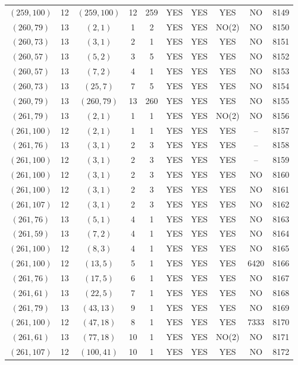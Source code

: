 \begin{longtable}{|c|c|c|c|c|c|c|c|c|c|}
$(259, 100)$ & 12 & $(259, 100)$ & 12 & 259 & YES & YES & YES & NO & 8149\\
$(260, 79)$ & 13 & $(2, 1)$ & 1 & 2 & YES & YES & NO(2) & NO & 8150\\
$(260, 73)$ & 13 & $(3, 1)$ & 2 & 1 & YES & YES & YES & NO & 8151\\
$(260, 57)$ & 13 & $(5, 2)$ & 3 & 5 & YES & YES & YES & NO & 8152\\
$(260, 57)$ & 13 & $(7, 2)$ & 4 & 1 & YES & YES & YES & NO & 8153\\
$(260, 73)$ & 13 & $(25, 7)$ & 7 & 5 & YES & YES & YES & NO & 8154\\
$(260, 79)$ & 13 & $(260, 79)$ & 13 & 260 & YES & YES & YES & NO & 8155\\
$(261, 79)$ & 13 & $(2, 1)$ & 1 & 1 & YES & YES & NO(2) & NO & 8156\\
$(261, 100)$ & 12 & $(2, 1)$ & 1 & 1 & YES & YES & YES & -- & 8157\\
$(261, 76)$ & 13 & $(3, 1)$ & 2 & 3 & YES & YES & YES & -- & 8158\\
$(261, 100)$ & 12 & $(3, 1)$ & 2 & 3 & YES & YES & YES & -- & 8159\\
$(261, 100)$ & 12 & $(3, 1)$ & 2 & 3 & YES & YES & YES & NO & 8160\\
$(261, 100)$ & 12 & $(3, 1)$ & 2 & 3 & YES & YES & YES & NO & 8161\\
$(261, 107)$ & 12 & $(3, 1)$ & 2 & 3 & YES & YES & YES & NO & 8162\\
$(261, 76)$ & 13 & $(5, 1)$ & 4 & 1 & YES & YES & YES & NO & 8163\\
$(261, 59)$ & 13 & $(7, 2)$ & 4 & 1 & YES & YES & YES & NO & 8164\\
$(261, 100)$ & 12 & $(8, 3)$ & 4 & 1 & YES & YES & YES & NO & 8165\\
$(261, 100)$ & 12 & $(13, 5)$ & 5 & 1 & YES & YES & YES & 6420 & 8166\\
$(261, 76)$ & 13 & $(17, 5)$ & 6 & 1 & YES & YES & YES & NO & 8167\\
$(261, 61)$ & 13 & $(22, 5)$ & 7 & 1 & YES & YES & YES & NO & 8168\\
$(261, 79)$ & 13 & $(43, 13)$ & 9 & 1 & YES & YES & YES & NO & 8169\\
$(261, 100)$ & 12 & $(47, 18)$ & 8 & 1 & YES & YES & YES & 7333 & 8170\\
$(261, 61)$ & 13 & $(77, 18)$ & 10 & 1 & YES & YES & NO(2) & NO & 8171\\
$(261, 107)$ & 12 & $(100, 41)$ & 10 & 1 & YES & YES & YES & NO & 8172\\

\end{longtable}
